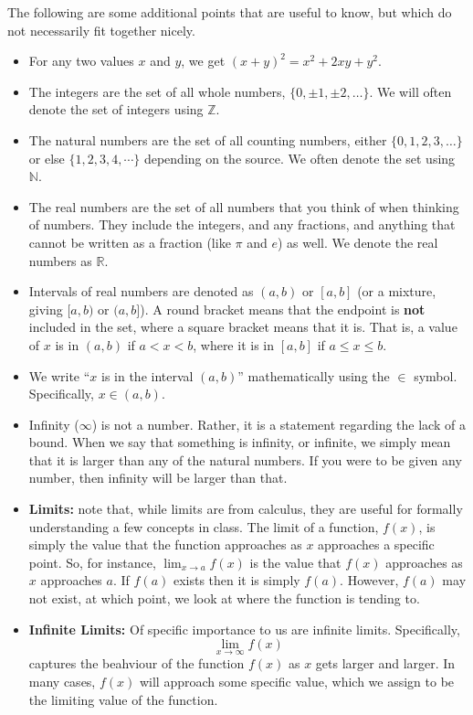 \documentclass[
  letterpaper,
  DIV=11,
  numbers=noendperiod]{scrreprt}
\providecommand{\tightlist}{%
  \setlength{\itemsep}{0pt}\setlength{\parskip}{0pt}}\usepackage{longtable,booktabs,array}
\theoremstyle{definition}
\theoremstyle{definition}
\theoremstyle{definition}
\theoremstyle{remark}
\begin{document}
The following are some additional points that are useful to know, but
which do not necessarily fit together nicely.

\begin{itemize}
\tightlist
\item
  For any two values \(x\) and \(y\), we get
  \((x + y)^2 = x^2 + 2xy + y^2\).
\item
  The integers are the set of all whole numbers,
  \(\{0, \pm1,\pm2,\dots\}\). We will often denote the set of integers
  using \(\mathbb{Z}\).
\item
  The natural numbers are the set of all counting numbers, either
  \(\{0,1,2,3,\dots\}\) or else \(\{1,2,3,4,\cdots\}\) depending on the
  source. We often denote the set using \(\mathbb{N}\).
\item
  The real numbers are the set of all numbers that you think of when
  thinking of numbers. They include the integers, and any fractions, and
  anything that cannot be written as a fraction (like \(\pi\) and \(e\))
  as well. We denote the real numbers as \(\mathbb{R}\).
\item
  Intervals of real numbers are denoted as \((a,b)\) or \([a,b]\) (or a
  mixture, giving \([a,b)\) or \((a,b]\)). A round bracket means that
  the endpoint is \textbf{not} included in the set, where a square
  bracket means that it is. That is, a value of \(x\) is in \((a,b)\) if
  \(a < x < b\), where it is in \([a,b]\) if \(a \leq x \leq b\).
\item
  We write ``\(x\) is in the interval \((a,b)\)'' mathematically using
  the \(\in\) symbol. Specifically, \(x \in (a,b)\).
\item
  Infinity (\(\infty\)) is not a number. Rather, it is a statement
  regarding the lack of a bound. When we say that something is infinity,
  or infinite, we simply mean that it is larger than any of the natural
  numbers. If you were to be given any number, then infinity will be
  larger than that.
\item
  \textbf{Limits:} note that, while limits are from calculus, they are
  useful for formally understanding a few concepts in class. The limit
  of a function, \(f(x)\), is simply the value that the function
  approaches as \(x\) approaches a specific point. So, for instance,
  \(\lim_{x\to a} f(x)\) is the value that \(f(x)\) approaches as \(x\)
  approaches \(a\). If \(f(a)\) exists then it is simply \(f(a)\).
  However, \(f(a)\) may not exist, at which point, we look at where the
  function is tending to.
\item
  \textbf{Infinite Limits:} Of specific importance to us are infinite
  limits. Specifically, \[\lim_{x\to\infty}f(x)\] captures the beahviour
  of the function \(f(x)\) as \(x\) gets larger and larger. In many
  cases, \(f(x)\) will approach some specific value, which we assign to
  be the limiting value of the function.
\end{itemize}
\end{document}
